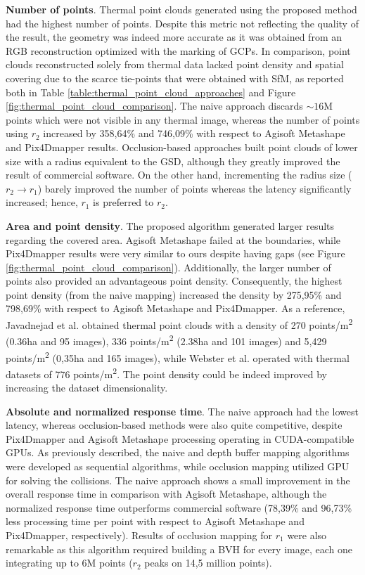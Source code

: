 \textbf{Number of points}. Thermal point clouds generated using the proposed method had the highest number of points. Despite this metric not reflecting the quality of the result, the geometry was indeed more accurate as it was obtained from an RGB reconstruction optimized with the marking of GCPs. In comparison, point clouds reconstructed solely from thermal data lacked point density and spatial covering due to the scarce tie-points that were obtained with SfM, as reported both in Table \ref{table:thermal_point_cloud_approaches} and Figure \ref{fig:thermal_point_cloud_comparison}. The naive approach discards $\sim16$M points which were not visible in any thermal image, whereas the number of points using $r_2$ increased by 358,64\% and 746,09\% with respect to Agisoft Metashape and Pix4Dmapper results. Occlusion-based approaches built point clouds of lower size with a radius equivalent to the GSD, although they greatly improved the result of commercial software. On the other hand, incrementing the radius size ($r_2 \rightarrow r_1$) barely improved the number of points whereas the latency significantly increased; hence, $r_1$ is preferred to $r_2$.

\textbf{Area and point density}. The proposed algorithm generated larger results regarding the covered area. Agisoft Metashape failed at the boundaries, while Pix4Dmapper results were very similar to ours despite having gaps (see Figure \ref{fig:thermal_point_cloud_comparison}). Additionally, the larger number of points also provided an advantageous point density. Consequently, the highest point density (from the naive mapping) increased the density by 275,95\% and 798,69\% with respect to Agisoft Metashape and Pix4Dmapper. As a reference, Javadnejad et al. \cite{javadnejad_photogrammetric_2020} obtained thermal point clouds with a density of 270 points/\si{\meter\squared} (0.36\si{\hectare} and 95 images), 336 points/\si{\meter\squared} (2.38\si{\hectare} and 101 images) and 5,429 points/\si{\meter\squared} (0,35\si{\hectare} and 165 images), while Webster et al. \cite{webster_three-dimensional_2018} operated with thermal datasets of 776 points/\si{\meter\squared}. The point density could be indeed improved by increasing the dataset dimensionality.

\textbf{Absolute and normalized response time}. The naive approach had the lowest latency, whereas occlusion-based methods were also quite competitive, despite Pix4Dmapper and Agisoft Metashape processing operating in CUDA-compatible GPUs. As previously described, the naive and depth buffer mapping algorithms were developed as sequential algorithms, while occlusion mapping utilized GPU for solving the collisions. The naive approach shows a small improvement in the overall response time in comparison with Agisoft Metashape, although the normalized response time outperforms commercial software (78,39\% and 96,73\% less processing time per point with respect to Agisoft Metashape and Pix4Dmapper, respectively). Results of occlusion mapping for $r_1$ were also remarkable as this algorithm required building a BVH for every image, each one integrating up to 6M points ($r_2$ peaks on 14,5 million points). 

